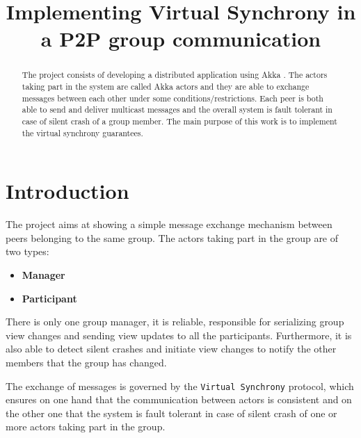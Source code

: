 \documentclass[conference]{IEEEtran}
\begin{document}
\title{Implementing Virtual Synchrony in a P2P group communication}

\author{
}

\maketitle

\begin{abstract}
The project consists of developing a distributed application using Akka \cite{Akka}. 
The actors taking part in the system are called Akka actors and they are able to exchange messages between each other under some conditions/restrictions. 
Each peer is both able to send and deliver multicast messages and the overall system is fault tolerant in case of silent crash of a group member. 
The main purpose of this work is to implement the virtual synchrony guarantees.

\end{abstract}

\section{Introduction}
\label{sec:introduction}
The project aims at showing a simple message exchange mechanism between
peers belonging to the same group. The actors taking part in the group
are of two types:
\begin{itemize}
	\item \textbf{Manager}
	\item \textbf{Participant}
\end{itemize} 
There is only one group manager, it is reliable, responsible for serializing group view
changes and sending view updates to all the participants. 
Furthermore, it is also able to detect silent crashes and initiate view changes to notify the other members that the group has changed.

The exchange of messages is governed by the \texttt{Virtual Synchrony} protocol, 
which ensures on one hand that the communication between actors is consistent and on the other one that the system is fault tolerant in case of silent crash of one or more actors taking part in the group.
\end{document}
